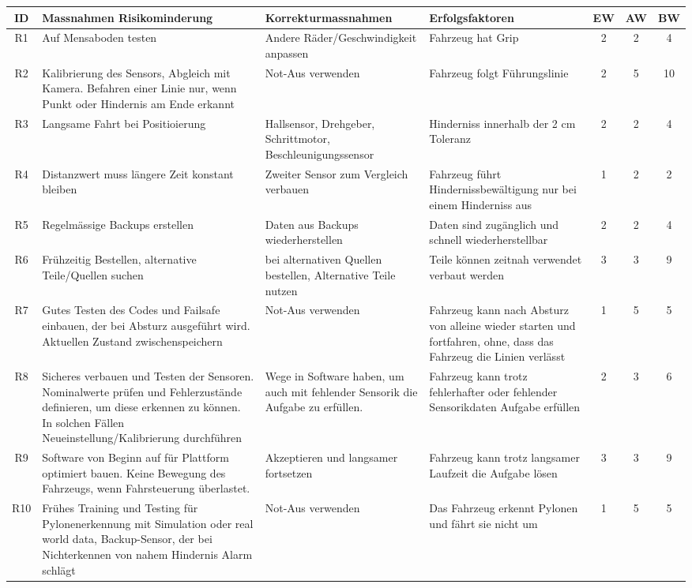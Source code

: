 \begin{landscape}
\begin{longtable}{|c|p{7cm}|p{5cm}|p{5cm}|c|c|c|}
\hline
\textbf{ID} & \textbf{Massnahmen Risikominderung} & \textbf{Korrekturmassnahmen} & \textbf{Erfolgsfaktoren} & \textbf{EW} & \textbf{AW} & \textbf{BW} \\ \hline
R1  & Auf Mensaboden testen & Andere Räder/Geschwindigkeit anpassen & Fahrzeug hat Grip & 2 & 2 & 4 \\ \hline
R2  & Kalibrierung des Sensors, Abgleich mit Kamera. Befahren einer Linie nur, wenn Punkt oder Hindernis am Ende erkannt & Not-Aus verwenden & Fahrzeug folgt Führungslinie & 2 & 5 & 10 \\ \hline
R3  & Langsame Fahrt bei Positioierung & Hallsensor, Drehgeber, Schrittmotor, Beschleunigungssensor & Hinderniss innerhalb der 2 cm Toleranz & 2 & 2 & 4 \\ \hline
R4  & Distanzwert muss längere Zeit konstant bleiben & Zweiter Sensor zum Vergleich verbauen & Fahrzeug führt Hindernissbewältigung nur bei einem Hinderniss aus & 1 & 2 & 2 \\ \hline
R5  & Regelmässige Backups erstellen & Daten aus Backups wiederherstellen & Daten sind zugänglich und schnell wiederherstellbar & 2 & 2 & 4 \\ \hline
R6  & Frühzeitig Bestellen, alternative Teile/Quellen suchen & bei alternativen Quellen bestellen, Alternative Teile nutzen & Teile können zeitnah verwendet verbaut werden & 3 & 3 & 9 \\ \hline
R7  & Gutes Testen des Codes und Failsafe einbauen, der bei Absturz ausgeführt wird. Aktuellen Zustand zwischenspeichern & Not-Aus verwenden & Fahrzeug kann nach Absturz von alleine wieder starten und fortfahren, ohne, dass das Fahrzeug die Linien verlässt & 1 & 5 & 5 \\ \hline
R8  & Sicheres verbauen und Testen der Sensoren. Nominalwerte prüfen und Fehlerzustände definieren, um diese erkennen zu können. In solchen Fällen Neueinstellung/Kalibrierung durchführen & Wege in Software haben, um auch mit fehlender Sensorik die Aufgabe zu erfüllen. & Fahrzeug kann trotz fehlerhafter oder fehlender Sensorikdaten Aufgabe erfüllen & 2 & 3 & 6 \\ \hline
R9  & Software von Beginn auf für Plattform optimiert bauen. Keine Bewegung des Fahrzeugs, wenn Fahrsteuerung überlastet. & Akzeptieren und langsamer fortsetzen & Fahrzeug kann trotz langsamer Laufzeit die Aufgabe lösen & 3 & 3 & 9 \\ \hline
R10 & Frühes Training und Testing für Pylonenerkennung mit Simulation oder real world data, Backup-Sensor, der bei Nichterkennen von nahem Hindernis Alarm schlägt & Not-Aus verwenden & Das Fahrzeug erkennt Pylonen und fährt sie nicht um & 1 & 5 & 5 \\ \hline

\end{longtable}
\end{landscape}
